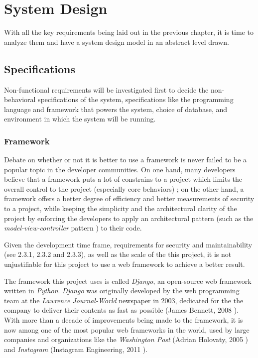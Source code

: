 

\chapter{System Design}
\label{chap:SYSDES}

With all the key requirements being laid out in the previous chapter, it is
time to analyze them and have a system design model in an abstract
level drawn. 

\section{Specifications}
Non-functional requirements will be investigated first to decide the
non-behavioral specifications of the system, specifications like the
programming language and framework that powers the system, choice of database,
and environment in which the system will be running.

\subsection{Framework}
Debate on whether or not it is better to use a framework is never failed to be
a popular topic in the developer communities. On one hand, many developers
believe that a framework puts a lot of constrains to a project which limits the
overall control to the project (especially core behaviors) \cite{frameworks};
on the other hand, a framework offers a better degree of efficiency and better
measurements of security to a project, while keeping the simplicity and
the architectural clarity of the project by enforcing the developers to apply
an architectural pattern (such as the \emph{model-view-controller} pattern
\cite{mvc}) to their code.

\medskip

Given the development time frame, requirements for
security and maintainability (see 2.3.1, 2.3.2 and 2.3.3),
as well as the scale of the this project,
it is not unjustifiable for this project to use a web framework to achieve a
better result.

\medskip

The framework this project uses is called \emph{Django}, an open-source web
framework written in \emph{Python}. \emph{Django} was originally developed by
the web programming team at the \emph{Lawrence Journal-World} newspaper in 2003,
dedicated for the the company to deliver their contents as fast as possible
(James Bennett, 2008 \cite{django}). With more than a decade of improvements
being made to the framework, it is now among one of the most popular web
frameworks in the world, used by large companies and organizations like the
\emph{Washington Post} (Adrian Holovaty, 2005 \cite{djangoWashingtonPost})
and \emph{Instagram} (Instagram Engineering, 2011 \cite{djangoInstagram}).
\medskip

